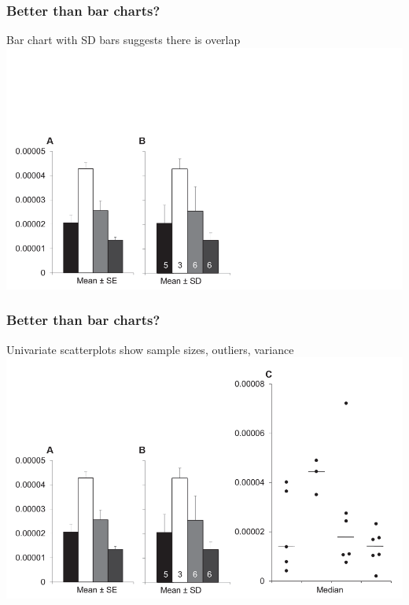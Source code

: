 \begin{frame}
  \frametitle{Better than bar charts?}
  \textcolor{hutton_blue}{Bar chart with SD bars suggests there is overlap}
    \includegraphics[width=1\textwidth]{images/weissgerber_bar_scatter2}    
\end{frame}

\begin{frame}
  \frametitle{Better than bar charts?}
  \textcolor{hutton_purple}{Univariate scatterplots show sample sizes, outliers, variance}
    \includegraphics[width=1\textwidth]{images/weissgerber_bar_scatter3}    
\end{frame}